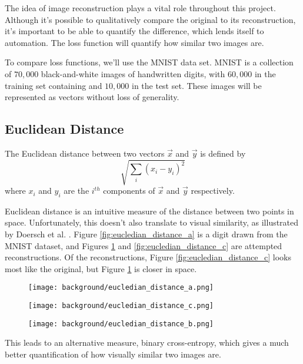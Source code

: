 The idea of image reconstruction plays a vital role throughout this project. Although it's possible to qualitatively compare the original to its reconstruction, it's important to be able to quantify the difference, which lends itself to automation. The loss function will quantify how similar two images are.

To compare loss functions, we'll use the MNIST data set. MNIST is a collection of $70,000$ black-and-white images of handwritten digits, with $60,000$ in the training set containing and $10,000$ in the test set. These images will be represented as vectors without loss of generality.

\subsection{Euclidean Distance}

The Euclidean distance between two vectors $\vec{x}$ and $\vec{y}$ is defined by $$\sqrt{\sum_{i}(x_i - y_i)^2}$$ where $x_i$ and $y_i$ are the $i^{th}$ components of $\vec{x}$ and $\vec{y}$ respectively.

Euclidean distance is an intuitive measure of the distance between two points in space. Unfortunately, this doesn't also translate to visual similarity, as illustrated by Doersch et al. \cite{Doersch2016}. Figure \ref{fig:eucledian_distance_a} is a digit drawn from the MNIST dataset, and Figures \ref{fig:eucledian_distance_b} and \ref{fig:eucledian_distance_c} are attempted reconstructions. Of the reconstructions, Figure \ref{fig:eucledian_distance_c} looks most like the original, but Figure \ref{fig:eucledian_distance_b} is closer in space.\\

\begin{figure}[!htb]
\centering
{}
\centering
  \texttt{[image: background/eucledian\_distance\_a.png]}
  \caption{}\label{fig:eucledian_distance_a}
\endminipage\hfill
{}
\centering
  \texttt{[image: background/eucledian\_distance\_c.png]}
  \caption{}\label{fig:eucledian_distance_c}
\endminipage\hfill
{}%
\centering
  \texttt{[image: background/eucledian\_distance\_b.png]}
  \caption{}\label{fig:eucledian_distance_b}
\endminipage
\end{figure}

This leads to an alternative measure, binary cross-entropy, which gives a much better quantification of how visually similar two images are.

